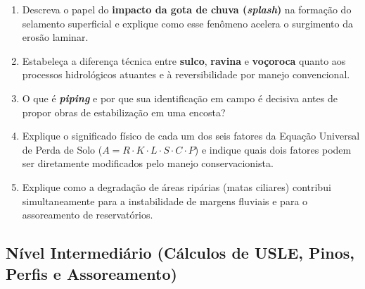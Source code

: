 \begin{enumerate}[leftmargin=1.8em, itemsep=6pt]
  \item Descreva o papel do \textbf{impacto da gota de chuva (\textit{splash})} na formação do selamento superficial e explique como esse fenômeno acelera o surgimento da erosão laminar.
  \espacoResolucao[1.8cm]

  \item Estabeleça a diferença técnica entre \textbf{sulco}, \textbf{ravina} e \textbf{voçoroca} quanto aos processos hidrológicos atuantes e à reversibilidade por manejo convencional.
  \espacoResolucao[1.8cm]

  \item O que é \textbf{\textit{piping}} e por que sua identificação em campo é decisiva antes de propor obras de estabilização em uma encosta?
  \espacoResolucao[1.8cm]

  \item Explique o significado físico de cada um dos seis fatores da Equação Universal de Perda de Solo ($A = R \cdot K \cdot L \cdot S \cdot C \cdot P$) e indique quais dois fatores podem ser diretamente modificados pelo manejo conservacionista.
  \espacoResolucao[1.8cm]

  \item Explique como a degradação de áreas ripárias (matas ciliares) contribui simultaneamente para a instabilidade de margens fluviais e para o assoreamento de reservatórios.
  \espacoResolucao[1.8cm]
\end{enumerate}

\subsection*{Nível Intermediário (Cálculos de USLE, Pinos, Perfis e Assoreamento)}

